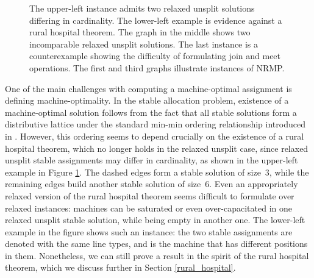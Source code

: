 \documentclass{llncs}
\newcommand{\mycaption}[2]
 {\begin{center} \parbox{4in}{\caption{\small #2 \label{#1}}} \end{center}}
\begin{document}
\begin{figure}[t]
\begin{center}
\begin{minipage}{.35\textwidth}
\end{minipage}
\mycaption{label6}{The upper-left instance admits two relaxed unsplit solutions differing in
cardinality.  The lower-left example is evidence against a rural hospital theorem.  The graph in the middle shows two incomparable relaxed unsplit solutions. The last instance is a counterexample showing the difficulty of formulating join and meet operations. The first and third graphs illustrate instances of NRMP.}
\end{center}
\end{figure}

One of the main challenges with computing a machine-optimal assignment
is defining machine-optimality.  In the stable allocation problem,
existence of a machine-optimal solution follows from the fact that all
stable solutions form a distributive lattice under the standard
min-min ordering relationship introduced in
\cite{DBLP:journals/mor/BaiouB02}.  However, this ordering seems to
depend crucially on the existence of a rural hospital theorem, which
no longer holds in the relaxed unsplit case, since relaxed unsplit
stable assignments may differ in cardinality, as shown in the
upper-left example in Figure \ref{label6}.  The dashed edges form a
stable solution of size~3, while the remaining edges build another
stable solution of size~6. Even an appropriately relaxed version of
the rural hospital theorem seems difficult to formulate over 
relaxed instances: machines can be saturated or even over-capacitated
in one relaxed unsplit stable solution, while being empty in another
one. The lower-left example in the figure shows such an instance: the
two stable assignments are denoted with the same line types, and 
is the machine that has different positions in them.  Nonetheless,
we can still prove a result in the spirit of the rural hospital theorem,
which we discuss further in Section \ref{rural_hospital}.
\end{document}
